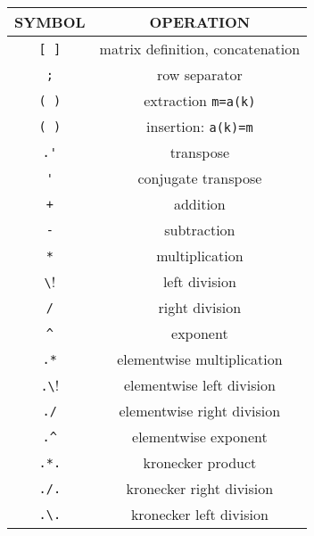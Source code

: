 \begin{center}
\begin{tabular}{|c|c|}
\hline
SYMBOL & OPERATION 
\\ \hline \hline
\verb![ ]! & matrix definition, concatenation\\ \hline

\verb!;! & row separator\\ \hline

\verb!( )! & extraction \verb!m=a(k)! \\ \hline

\verb!( )! & insertion:  \verb!a(k)=m!  \\ \hline

\verb!.'! & transpose \\ \hline

\verb!'! & conjugate transpose \\ \hline

\verb!+! & addition  \\ \hline

\verb!-! & subtraction \\ \hline

\verb!*! & multiplication \\ \hline

\verb!\! & left division \\ \hline

\verb!/! & right division \\ \hline

\verb!^! &  exponent \\ \hline

\verb!.*! & elementwise multiplication  \\ \hline

\verb!.\! &  elementwise left division  \\ \hline

\verb!./! &  elementwise right division  \\ \hline

\verb!.^! &  elementwise exponent  \\ \hline

\verb!.*.! & kronecker product \\ \hline

\verb!./.! & kronecker right division \\ \hline

\verb!.\.! &  kronecker left division \\ \hline  
\end{tabular}
\end{center}

